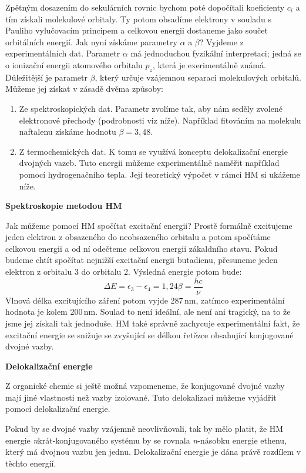 Zpětným dosazením do sekulárních rovnic bychom poté dopočítali koeficienty $c_i$ a tím získali molekulové orbitaly. Ty potom obsadíme elektrony v souladu s Pauliho vylučovacím principem a celkovou energii dostaneme jako součet orbitálních energií. 
Jak nyní získáme parametry $\alpha$ a $\beta$? Vyjdeme z experimentálních dat. Parametr $\alpha$ má jednoduchou fyzikální interpretaci; jedná se o ionizační energii atomového orbitalu $p_z$, která je exerimentálně známá. Důležitější je parametr $\beta$, který určuje vzájemnou separaci molekulových orbitalů. Můžeme jej získat v zásadě dvěma způsoby:
\begin{enumerate}
\item Ze spektroskopických dat. Parametr zvolíme tak, aby nám seděly zvolené elektronové přechody (podrobnosti viz níže). Například fitováním na molekulu naftalenu získáme hodnotu $\beta=3,48$.
\item Z termochemických dat. K tomu se využívá konceptu delokalizační energie dvojných vazeb. Tuto energii můžeme experimentálně naměřit například pomocí hydrogenačního tepla. Její teoretický výpočet v rámci HM si ukážeme níže. 
\end{enumerate}

\noindent
\textbf{Spektroskopie metodou HM}

Jak můžeme pomocí HM spočítat excitační energii? Prostě formálně excitujeme jeden elektron z obsazeného do neobsazeného orbitalu a potom spočítáme celkovou energii a od ní odečteme celkovou energii zákaldního stavu. Pokud budeme chtít spočítat nejnižší excitační energii butadienu, přesuneme jeden elektron z orbitalu 3 do orbitalu 2. Výsledná energie potom bude:
$$
\Delta E = \epsilon_3-\epsilon_4 = 1,24 \beta = \frac{hc}{\nu} 
$$
Vlnová délka excitujícího záření potom vyjde 287\,nm, zatímco experimentální hodnota je kolem 200\,nm.
Soulad to není ideální, ale není ani tragický, na to že jsme jej získali tak jednoduše. HM také správně zachycuje experimentální fakt, že excitační energie se snižuje se zvyšující se délkou řetězce obsahující konjugované dvojné vazby.

\medskip
\noindent
\textbf{Delokalizační energie}

Z organické chemie si ještě možná vzpomeneme,
že konjugované dvojné vazby mají jiné vlastnosti než vazby izolované.
Tuto delokalizaci můžeme vyjádřit pomocí delokalizační energie.

Pokud by se dvojné vazby vzájemně neovlivňovali, tak by mělo platit, že HM energie
\textit{n}krát-konjugovaného systému by se rovnala \textit{n}-násobku energie ethenu, který má dvojnou vazbu jen jednu. Delokalizační energie je dána právě rozdílem v těchto energií.

